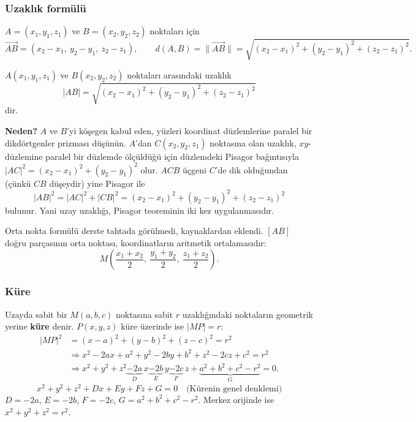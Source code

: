 \subsubsection{Uzaklık formülü}

\begin{tahta}
$A=(x_1,y_1,z_1)$ ve $B=(x_2,y_2,z_2)$ noktaları için
\[
\overrightarrow{AB}=(x_2-x_1,\ y_2-y_1,\ z_2-z_1),\qquad
d(A,B)=\|\overrightarrow{AB}\|=\sqrt{(x_2-x_1)^2+(y_2-y_1)^2+(z_2-z_1)^2}.
\]
\end{tahta}

\begin{teorem}
$A(x_1,y_1,z_1)$ ve $B(x_2,y_2,z_2)$ noktaları arasındaki uzaklık
\[
|AB|=\sqrt{(x_2-x_1)^2+(y_2-y_1)^2+(z_2-z_1)^2}
\]
dir.
\end{teorem}

\textbf{Neden?} $A$ ve $B$'yi köşegen kabul eden, yüzleri koordinat düzlemlerine paralel bir dikdörtgenler prizması düşünün. $A$'dan $C(x_2,y_2,z_1)$ noktasına olan uzaklık, $xy$-düzlemine paralel bir düzlemde ölçüldüğü için düzlemdeki Pisagor bağıntısıyla $|AC|^2=(x_2-x_1)^2+(y_2-y_1)^2$ olur. $ACB$ üçgeni $C$'de dik olduğundan (çünkü $CB$ düşeydir) yine Pisagor ile
\[
|AB|^2=|AC|^2+|CB|^2=(x_2-x_1)^2+(y_2-y_1)^2+(z_2-z_1)^2
\]
bulunur. Yani uzay uzaklığı, Pisagor teoreminin iki kez uygulanmasıdır.

\begin{bilgi}
Orta nokta formülü derste tahtada görülmedi, kaynaklardan eklendi. $[AB]$ doğru parçasının orta noktası, koordinatların aritmetik ortalamasıdır:
\[
M\left(\frac{x_1+x_2}{2},\ \frac{y_1+y_2}{2},\ \frac{z_1+z_2}{2}\right).
\]
\end{bilgi}

\subsubsection{Küre}

\begin{tahta}
Uzayda sabit bir $M(a,b,c)$ noktasına sabit $r$ uzaklığındaki noktaların geometrik yerine \textbf{küre} denir. $P(x,y,z)$ küre üzerinde ise $|MP|=r$:
\begin{align*}
|MP|^2&=(x-a)^2+(y-b)^2+(z-c)^2=r^2\\
&\Rightarrow x^2-2ax+a^2+y^2-2by+b^2+z^2-2cz+c^2=r^2\\
&\Rightarrow x^2+y^2+z^2\underbrace{-2a}_{D}\,x\underbrace{-2b}_{E}\,y\underbrace{-2c}_{F}\,z+\underbrace{a^2+b^2+c^2-r^2}_{G}=0 .
\end{align*}
\[
\boxed{x^2+y^2+z^2+Dx+Ey+Fz+G=0}\quad\text{(Kürenin genel denklemi)}
\]
$D=-2a$, $E=-2b$, $F=-2c$, $G=a^2+b^2+c^2-r^2$. Merkez orijinde ise $x^2+y^2+z^2=r^2$.
\end{tahta}


